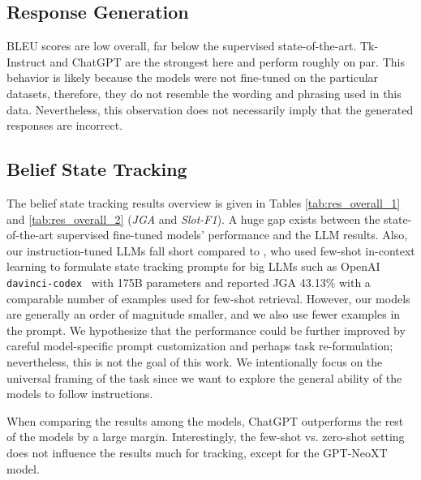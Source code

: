 \subsection{Response Generation}
BLEU scores are low overall, far below the supervised state-of-the-art.
Tk-Instruct and ChatGPT are the strongest here and perform roughly on par.
This behavior is likely because the models were not fine-tuned on the particular datasets, therefore, they do not resemble the wording and phrasing used in this data.
Nevertheless, this observation does not necessarily imply that the generated responses are incorrect.


\subsection{Belief State Tracking}
\label{subsec:dst}
The belief state tracking results overview is given in Tables \ref{tab:res_overall_1} and \ref{tab:res_overall_2} (\emph{JGA} and \emph{Slot-F1}).
A huge gap exists between the state-of-the-art supervised fine-tuned models' performance and the LLM results.
Also, our instruction-tuned LLMs fall short compared to \citet{hu-etal-2022-context}, who used few-shot in-context learning to formulate state tracking prompts for big LLMs such as OpenAI \texttt{davinci-codex}~\citep{chen2021evaluating} with 175B parameters and reported JGA 43.13\% with a comparable number of examples used for few-shot retrieval.
However, our models are generally an order of magnitude smaller, and we also use fewer examples in the prompt.
We hypothesize that the performance could be further improved by careful model-specific prompt customization and perhaps task re-formulation; nevertheless, this is not the goal of this work.
We intentionally focus on the universal framing of the task since we want to explore the general ability of the models to follow instructions.

When comparing the results among the models, ChatGPT outperforms the rest of the models by a large margin. 
Interestingly, the few-shot vs. zero-shot setting does not influence the results much for tracking, except for the GPT-NeoXT model.

